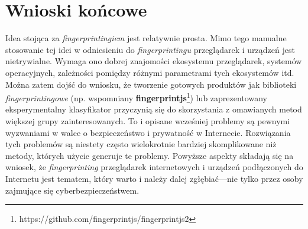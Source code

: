 \section*{Wnioski końcowe}
Idea stojąca za \emph{fingerprintingiem} jest relatywnie prosta. Mimo tego
manualne stosowanie tej idei w odniesieniu do \emph{fingerprintingu}
przeglądarek i urządzeń jest nietrywialne. Wymaga ono dobrej znajomości
ekosystemu przeglądarek, systemów operacyjnych, zależności pomiędzy różnymi
parametrami tych ekosystemów itd. Można zatem dojść do wniosku, że tworzenie
gotowych produktów jak biblioteki \emph{fingerprintingowe} (np. wspomniany
\textbf{fingerprintjs}\footnote{https://github.com/fingerprintjs/fingerprintjs2})
lub zaprezentowany eksperymentalny klasyfikator przyczynią się do skorzystania z
omawianych metod większej grupy zainteresowanych. To i opisane wcześniej
problemy są pewnymi wyzwaniami w walce o bezpieczeństwo i prywatność w
Internecie. Rozwiązania tych problemów są niestety często wielokrotnie bardziej
skomplikowane niż metody, których użycie generuje te problemy. Powyższe aspekty
składają się na wniosek, że \emph{fingerprinting} przeglądarek internetowych i
urządzeń podłączonych do Internetu jest tematem, który warto i należy dalej
zgłębiać---nie tylko przez osoby zajmujące się cyberbezpieczeństwem.

